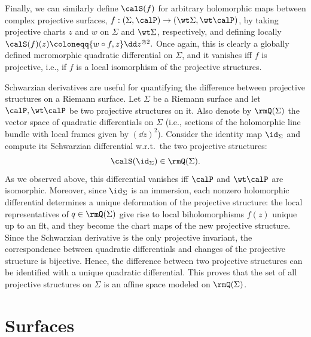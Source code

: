 \begin{rem}
    Finally, we can similarly define $\calS(f)$ for arbitrary holomorphic maps between complex projective surfaces, $f:(\Sigma,\calP)\to (\wt\Sigma,\wt\calP)$, by taking projective charts $z$ and $w$ on $\Sigma$ and $\wt\Sigma$, respectively, and defining locally 
    $\calS(f)(z)\coloneqq \{w\circ f,z\}\dd z^{\otimes 2}.$
    Once again, this is clearly a globally defined meromorphic quadratic differential on $\Sigma$, and it vanishes iff $f$ is projective, i.e., if $f$ is a local isomorphism of the projective structures.
\end{rem}

\begin{rem}
    Schwarzian derivatives are useful for quantifying the difference between projective structures on a Riemann surface. Let $\Sigma$ be a Riemann surface and let $\calP,\wt\calP$ be two projective structures on it. Also denote by $\rmQ(\Sigma)$ the vector space of quadratic differentials on $\Sigma$ (i.e., sections of the holomorphic line bundle with local frames given by $(\dd z)^2$). Consider the identity map $\id_\Sigma$ and compute its Schwarzian differential w.r.t.\ the two projective structures:
    \[\calS(\id_\Sigma)\in \rmQ(\Sigma).\]
    As we observed above, this differential vanishes iff $\calP$ and $\wt\calP$ are isomorphic. Moreover, since $\id_\Sigma$ is an immersion, each nonzero holomorphic differential determines a unique deformation of the projective structure: the local representatives of $q\in\rmQ(\Sigma)$ give rise to local biholomorphisms $f(z)$ unique up to an \gls{flt}, and they become the chart maps of the new projective structure. Since the Schwarzian derivative is the only projective invariant, the correspondence between quadratic differentials and changes of the projective structure is bijective. Hence, the difference between two projective structures can be identified with a unique quadratic differential. This proves that the set of all projective structures on $\Sigma$ is an affine space modeled on $\rmQ(\Sigma)$.
\end{rem}










\section{Surfaces}\label{sec: theory of surfaces}

